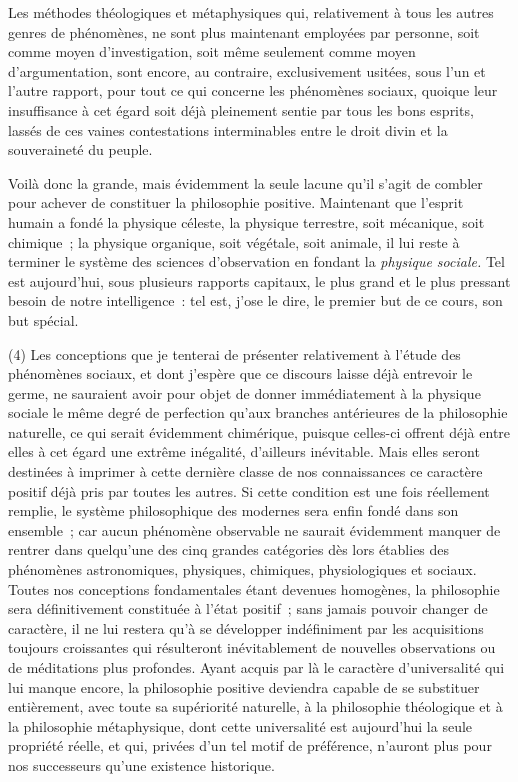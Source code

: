 \documentclass[french,twoside]{book} %
\begin{document}
Les méthodes théologiques et métaphysiques qui, relativement à tous les autres genres de phénomènes, ne sont plus maintenant employées par personne, soit comme moyen d’investigation, soit même seulement comme moyen d’argumentation, sont encore, au contraire, exclusivement usitées, sous l’un et l’autre rapport, pour tout ce qui concerne les phénomènes sociaux, quoique leur insuffisance à cet égard soit déjà pleinement sentie par tous les bons esprits, lassés de ces vaines contestations interminables entre le droit divin et la souveraineté du peuple.\par
Voilà donc la grande, mais évidemment la seule lacune qu’il s’agit de combler pour achever de constituer la philosophie positive. Maintenant que l’esprit humain a fondé la physique céleste, la physique terrestre, soit mécanique, soit chimique ; la physique organique, soit végétale, soit animale, il lui reste à terminer le système des sciences d’observation en fondant la {\itshape physique sociale.} Tel est aujourd’hui, sous plusieurs rapports capitaux, le plus grand et le plus pressant besoin de notre intelligence : tel est, j’ose le dire, le premier but de ce cours, son but spécial.\par
(4) Les conceptions que je tenterai de présenter relativement à l’étude des phénomènes sociaux, et dont j’espère que ce discours laisse déjà entrevoir le germe, ne sauraient avoir pour objet de donner immédiatement à la physique sociale le même degré de perfection qu’aux branches antérieures de la philosophie naturelle, ce qui serait évidemment chimérique, puisque celles-ci offrent déjà entre elles à cet égard une extrême inégalité, d’ailleurs inévitable. Mais elles seront destinées à imprimer à cette dernière classe de nos connaissances ce caractère positif déjà pris par toutes les autres. Si cette condition est une fois réellement remplie, le système philosophique des modernes sera enfin fondé dans son ensemble ; car aucun phénomène observable ne saurait évidemment manquer de rentrer dans quelqu’une des cinq grandes catégories dès lors établies des phénomènes astronomiques, physiques, chimiques, physiologiques et sociaux. Toutes nos conceptions fondamentales étant devenues homogènes, la philosophie sera définitivement constituée à l’état positif ; sans jamais pouvoir changer de caractère, il ne lui restera qu’à se développer indéfiniment par les acquisitions toujours croissantes qui résulteront inévitablement de nouvelles observations ou de méditations plus profondes. Ayant acquis par là le caractère d’universalité qui lui manque encore, la philosophie positive deviendra capable de se substituer entièrement, avec toute sa supériorité naturelle, à la philosophie théologique et à la philosophie métaphysique, dont cette universalité est aujourd’hui la seule propriété réelle, et qui, privées d’un tel motif de préférence, n’auront plus pour nos successeurs qu’une existence historique.\par
\end{document}
